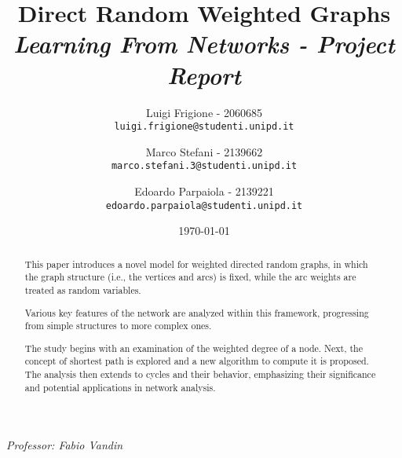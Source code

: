 \title{
    \textbf{Direct Random Weighted Graphs}\\[.5cm]
    
    {\large\emph{Learning From Networks - Project Report}}
}

\author{
  Luigi Frigione - 2060685\\
  \texttt{\small{luigi.frigione@studenti.unipd.it}}
  \and
  Marco Stefani - 2139662\\
  \texttt{\small{marco.stefani.3@studenti.unipd.it}}
  \and
  Edoardo Parpaiola - 2139221\\
  \texttt{\small{edoardo.parpaiola@studenti.unipd.it}}
}

\date{\today}

\maketitle

\begin{abstract}
This paper introduces a novel model for weighted directed random graphs, in which the graph structure (i.e., the vertices and arcs) is fixed, while the arc weights are treated as random variables.

Various key features of the network are analyzed within this framework, progressing from simple structures to more complex ones.

The study begins with an examination of the weighted degree of a node\cite{gonzalez2010an}.
Next, the concept of shortest path is explored and a new algorithm to compute it is proposed.
The analysis then extends to cycles and their behavior, emphasizing their
significance and potential applications in network analysis.
\end{abstract}

\vfill
{
    \emph{Professor: Fabio Vandin}
}

\newpage

\tableofcontents


